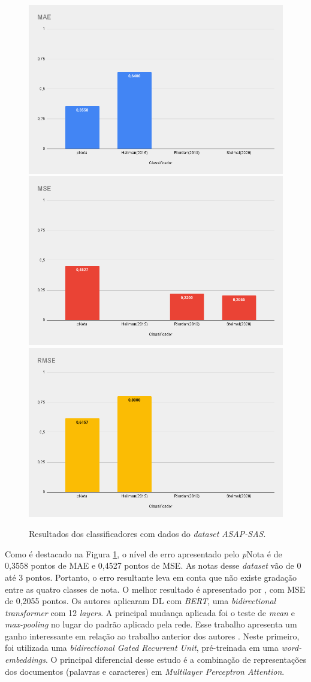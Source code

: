 \begin{figure}[!h]
\centering
\includegraphics[width=.6\textwidth]{figuras/ASAP/res-asap-mae.png}
\includegraphics[width=.6\textwidth]{figuras/ASAP/res-asap-mse.png}
\includegraphics[width=.6\textwidth]{figuras/ASAP/res-asap-rmse.png}
\caption{Resultados dos classificadores com dados do \textit{dataset} \textit{ASAP-SAS}.}
\label{fig-ASAP-SAS}
\end{figure}

Como é destacado na Figura \ref{fig-ASAP-SAS}, o nível de erro apresentado pelo \textit{p}Nota é de 0,3558 pontos de MAE e 0,4527 pontos de MSE. As notas desse \textit{dataset} vão de 0 até 3 pontos. Portanto, o erro resultante leva em conta que não existe gradação entre as quatro classes de nota. O melhor resultado é apresentado por \cite{steimel2020}, com MSE de 0,2055 pontos. Os autores aplicaram DL com \textit{BERT}, uma \textit{bidirectional transformer} com 12 \textit{layers}. A principal mudança aplicada foi o teste de \textit{mean} e \textit{max-pooling} no lugar do padrão aplicado pela rede. Esse trabalho apresenta um ganho interessante em relação ao trabalho anterior dos autores \cite{riordan2019}. Neste primeiro, foi utilizada uma \textit{bidirectional Gated Recurrent Unit}, pré-treinada em uma \textit{word-embeddings}. O principal diferencial desse estudo é a combinação de representações dos documentos (palavras e caracteres) em \textit{Multilayer Perceptron Attention}.

